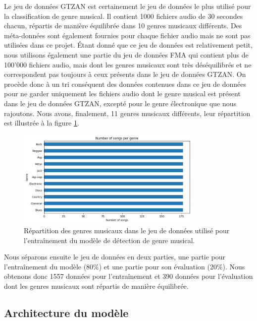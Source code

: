Le jeu de données GTZAN \cite{gtzan} est certainement le jeu de données le plus utilisé pour la classification de genre musical. Il contient 1000 fichiers audio de 30 secondes chacun, répartis de manière équilibrée dans 10 genres musicaux différents. Des méta-données sont également fournies pour chaque fichier audio mais ne sont pas utilisées dans ce projet. Étant donné que ce jeu de données est relativement petit, nous utilisons également une partie du jeu de données FMA \cite{fma_dataset} qui contient plus de 100'000 fichiers audio, mais dont les genres musicaux sont très déséquilibrés et ne correspondent pas toujours à ceux présents dans le jeu de données GTZAN. On procède donc à un tri conséquent des données contenues dans ce jeu de données pour ne garder uniquement les fichiers audio dont le genre musical est présent dans le jeu de données GTZAN, excepté pour le genre électronique que nous rajoutons. Nous avons, finalement, 11 genres musicaux différents, leur répartition est illustrée à la figure \ref{fig:genre_distribution}.

\begin{figure}[H]
    \centering
    \includegraphics[width=0.8\textwidth]{rsc/genre_distribution.png}
    \caption{Répartition des genres musicaux dans le jeu de données utilisé pour l'entraînement du modèle de détection de genre musical.}
    \label{fig:genre_distribution}
\end{figure}

Nous séparons ensuite le jeu de données en deux parties, une partie pour l'entraînement du modèle (80\%) et une partie pour son évaluation (20\%). Nous obtenons donc 1557 données pour l'entraînement et 390 données pour l'évaluation dont les genres musicaux sont répartis de manière équilibrée.

\subsection{Architecture du modèle}

